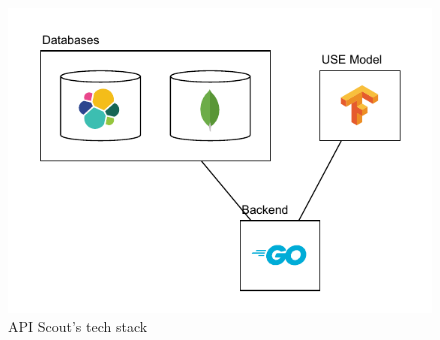 \begin{figure}[h]
    \begin{center}
        \includegraphics[width=0.6\linewidth]{assets/pdf/architecture/languages-architecture}
    \end{center}

    \caption{API Scout's tech stack}
    \label{fig:languages-architecture}
\end{figure}





